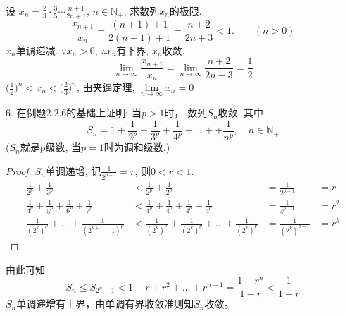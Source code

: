	设 $ x_n = \frac{2}{3}\cdot \frac{3}{5}\cdots\frac{n+1}{2n+1} $, $ n\in\mathbb{N}_+ $, 求数列{$ x_n $}的极限.
	\begin{equation}\label{2.3.2-4-001}
		\frac{x_{n+1}}{x_n} = \frac{(n+1)+1}{2(n+1)+1} = \frac{n+2}{2n+3} < 1.\qquad (n>0)
	\end{equation}
{$ x_n $}单调递减. $ \because x_n>0 $, $ \therefore  ${$ x_n $}有下界, {$ x_n $}收敛.\\
\begin{equation*}
	\lim_{n\rightarrow\infty}\frac{x_{n+1}}{x_n} = \lim_{n\rightarrow\infty} \frac{n+2}{2n+3}  =\frac{1}{2}
\end{equation*}
$ \Big(\frac{1}{2}\Big)^n < x_n < \Big(\frac{2}{3}\Big)^n $, 由夹逼定理, $ \lim\limits_{n\rightarrow\infty} x_n = 0 $

	6. 在例题2.2.6的基础上证明: 当$ p>1 $时， 数列{$ S_n $}收敛. 其中
	\begin{equation*}
		S_n=1+\frac{1}{2^p}+\frac{1}{3^p}+\frac{1}{4^p}+\dots++\frac{1}{n^p}, \quad n\in\mathbb{N}_+
	\end{equation*}
($ S_n $就是p级数, 当$ p=1 $时为调和级数.)
\begin{proof}
	{$ S_n $}单调递增, 记$ \frac{1}{2^{p-1}}  = r$, 则$ 0<r<1 $.
	\begin{align*}
		\frac{1}{2^p}+\frac{1}{3^p}&<\frac{1}{2^p}+\frac{1}{2^p} &= \frac{1}{2^{p-1}}&=r\\
		\frac{1}{4^p}+\frac{1}{5^p}+\frac{1}{6^p}+\frac{1}{7^p}&<\frac{1}{4^p}+\frac{1}{4^p}+\frac{1}{4^p}+\frac{1}{4^p} &= \frac{1}{4^{p-1}}&=r^2\\
		\frac{1}{(2^k)^p}+\dots+\frac{1}{(2^{k+1}-1)^p}&<\frac{1}{(2^k)^p}+\frac{1}{(2^k)^p}+\dots+\frac{1}{(2^k)^p} &= \frac{1}{(2^k)^{p-1}}&=r^k
	\end{align*}
\end{proof}
由此可知
\begin{equation*}
	S_n\leqslant S_{2^n-1} <1+r+r^2+\dots+r^{n-1} = \frac{1-r^n}{1-r}<\frac{1}{1-r}
\end{equation*}
{$ {S_n} $}单调递增有上界，由单调有界收敛准则知{$ S_n $}收敛。

